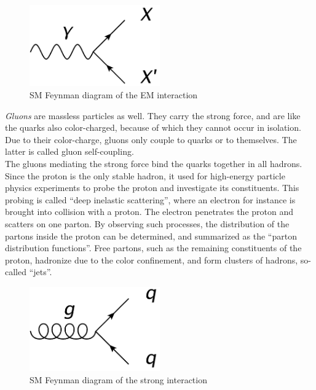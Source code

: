 \begin{minipage}{0.4\textwidth}
\centering
\begin{figure}[H]\centering
\includegraphics[width=0.5\textwidth]{Feynman_diagrams/Jaxo_EM.png}
\caption{SM Feynman diagram of the EM interaction}
\label{fig:Feynman:EM} 
\end{figure}
\end{minipage}

\begin{minipage}{0.55\textwidth}
\textit{Gluons} are massless particles as well.
They carry the strong force, and are like the quarks also color-charged, because of which they cannot occur in isolation.
Due to their color-charge, gluons only couple to quarks or to themselves.
The latter is called gluon self-coupling.\\
The gluons mediating the strong force bind the quarks together in all hadrons.
Since the proton is the only stable hadron, it used for high-energy particle physics experiments to probe the proton and investigate its constituents.
This probing is called ``deep inelastic scattering'', where an electron for instance is brought into collision with a proton.
The electron penetrates the proton and scatters on one parton.
By observing such processes, the distribution of the partons inside the proton can be determined, and summarized as the ``parton distribution functions''.
Free partons, such as the remaining constituents of the proton, hadronize due to the color confinement, and form clusters of hadrons, so-called ``jets''.

\end{minipage} \hfill
\begin{minipage}{0.4\textwidth}
\centering
\begin{figure}[H]\centering
\includegraphics[width=0.5\textwidth]{Feynman_diagrams/Jaxo_strong.png}
\caption{SM Feynman diagram of the strong interaction}
\label{fig:Feynman:strong} 
\end{figure}
\end{minipage}

